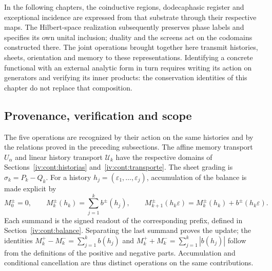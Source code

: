 In the following chapters, the coinductive regions, dodecaphasic register and exceptional incidence are expressed from that substrate through their respective maps. The Hilbert-space realization subsequently preserves phase labels and specifies its own unital inclusion; duality and the screens act on the codomains constructed there. The joint operations brought together here transmit histories, sheets, orientation and memory to these representations. Identifying a concrete functional with an external analytic form in turn requires writing its action on generators and verifying its inner products: the conservation identities of this chapter do not replace that composition.

\subsection{Provenance, verification and scope}
\label{iv:cont:mapa-correlativo}
The five operations are recognized by their action on the same
histories and by the relations proved in the preceding subsections.
The affine memory transport \(U_\alpha\) and linear
history transport \(\mathcal U_k\) have the respective domains of
Sections~\ref{iv:cont:historias}
and~\ref{iv:cont:transporte}. The sheet grading is
\(\sigma_k=P_k-Q_k\). For a history
\(h_j=(\varepsilon_1,\ldots,\varepsilon_j)\), accumulation of the
balance is made explicit by
\[
 M_0^\pm=0,\qquad
 M_k^\pm(h_k)=\sum_{j=1}^k b^\pm(h_j),\qquad
 M_{k+1}^\pm(h_k\varepsilon)
 =M_k^\pm(h_k)+b^\pm(h_k\varepsilon).
\]
Each summand is the signed readout of the corresponding prefix,
defined in Section~\ref{iv:cont:balance}. Separating the last
summand proves the update; the identities
\(M_k^+-M_k^-=\sum_{j=1}^kb(h_j)\) and
\(M_k^++M_k^-=\sum_{j=1}^k|b(h_j)|\) follow from the
definitions of the positive and negative parts. Accumulation and
conditional cancellation are thus distinct operations on the
same contributions.

